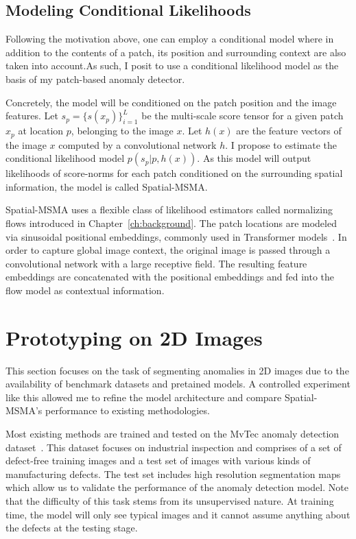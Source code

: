 \subsection*{Modeling Conditional Likelihoods}
Following the motivation above, one can employ a conditional model where in addition to the contents of a patch, its position and surrounding context are also taken into account.As such, I posit to use a conditional likelihood model as the basis of my patch-based anomaly detector.

Concretely, the model will be conditioned on the patch position and the image features. Let $ s_p = \{s(x_p)\}_{i=1}^{L}$ be the multi-scale score tensor for a given patch $x_p$ at location $p$, belonging to the image $x$. Let $h(x)$ are the feature vectors of the image $x$ computed by a convolutional network $h$. I propose to estimate the conditional likelihood model $p(s_p | p, h(x))$. As this model will output likelihoods of score-norms for each patch conditioned on the surrounding spatial information, the model is called Spatial-MSMA.

Spatial-MSMA uses a flexible class of likelihood estimators called normalizing flows introduced in Chapter~\ref{ch:background}. The patch locations are modeled via sinusoidal positional embeddings, commonly used in Transformer models~\cite{vaswani}. In order to capture global image context, the original image is passed through a convolutional network with a large receptive field. The resulting feature embeddings are concatenated with the positional embeddings and fed into the flow model as contextual information.

\section{Prototyping on 2D Images}

This section focuses on the task of segmenting anomalies in 2D images due to the availability of benchmark datasets and pretained models. A controlled experiment like this allowed me to refine the model architecture and compare Spatial-MSMA's performance to existing methodologies.

Most existing methods are trained and tested on the MvTec anomaly detection dataset~\cite{Bergmann_2019_CVPR}. This dataset focuses on industrial inspection and comprises of a set of defect-free training images and a test set of images with various kinds of manufacturing defects. The test set includes high resolution segmentation maps which allow us to validate the performance of the anomaly detection model. Note that the difficulty of this task stems from its unsupervised nature. At training time, the model will only see typical images and it cannot assume anything about the defects at the testing stage.

